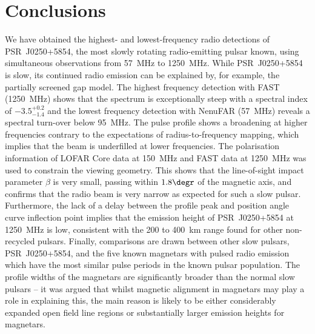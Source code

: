 \section{Conclusions}
\label{sec: J0250 - conclusions}

We have obtained the highest- and lowest-frequency radio detections of PSR~J0250+5854, the most slowly rotating radio-emitting pulsar known, using simultaneous observations from 57~MHz to 1250~MHz. While PSR~J0250+5854 is slow, its continued radio emission can be explained by, for example, the partially screened gap model. The highest frequency detection with FAST (1250~MHz) shows that the spectrum is exceptionally steep with a spectral index of $-3.5^{+0.2}_{-1.4}$ and the lowest frequency detection with NenuFAR (57~MHz) reveals a spectral turn-over below 95~MHz. The pulse profile shows a broadening at higher frequencies contrary to the expectations of radius-to-frequency mapping, which implies that the beam is underfilled at lower frequencies. The polarisation information of LOFAR Core data at 150~MHz and FAST data at 1250~MHz was used to constrain the viewing geometry. This shows that the line-of-sight impact parameter $\beta$ is very small, passing within $1.8\degr$ of the magnetic axis, and confirms that the radio beam is very narrow as expected for such a slow pulsar. Furthermore, the lack of a delay between the profile peak and position angle curve inflection point implies that the emission height of PSR~J0250+5854 at 1250~MHz is low, consistent with the 200 to 400~km range found for other non-recycled pulsars. Finally, comparisons are drawn between other slow pulsars, PSR~J0250+5854, and the five known magnetars with pulsed radio emission which have the most similar pulse periods in the known pulsar population. The profile widths of the magnetars are significantly broader than the normal slow pulsars -- it was argued that whilst magnetic alignment in magnetars may play a role in explaining this, the main reason is likely to be either considerably expanded open field line regions or substantially larger emission heights for magnetars.



